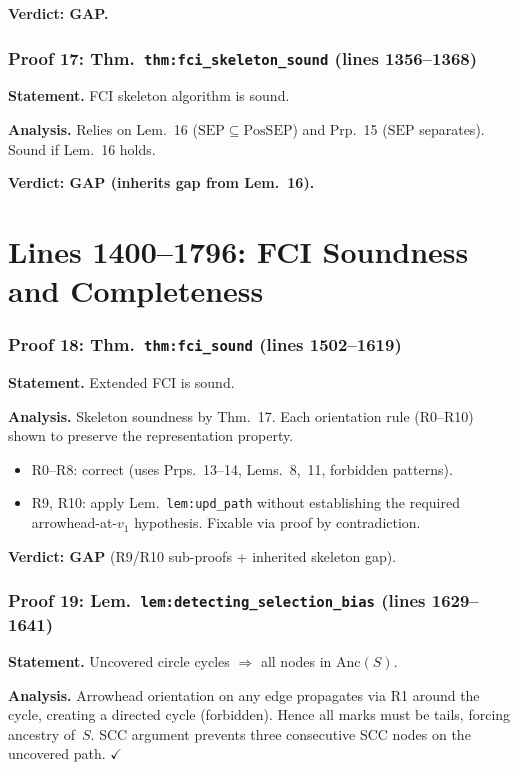 \documentclass{article}
\begin{document}
\textbf{Verdict: GAP.}

\section{Proof 17: Thm.\ \texttt{thm:fci\_skeleton\_sound} (lines 1356--1368)}
\textbf{Statement.} FCI skeleton algorithm is sound.

\textbf{Analysis.} Relies on Lem.~16 ($\mathrm{SEP}\subseteq\mathrm{PosSEP}$)
and Prp.~15 ($\mathrm{SEP}$ separates).  Sound if Lem.~16 holds.

\textbf{Verdict: GAP (inherits gap from Lem.~16).}

\part*{Lines 1400--1796: FCI Soundness and Completeness}

\section{Proof 18: Thm.\ \texttt{thm:fci\_sound} (lines 1502--1619)}
\textbf{Statement.} Extended FCI is sound.

\textbf{Analysis.}
Skeleton soundness by Thm.~17.  Each orientation rule (R0--R10) shown to
preserve the representation property.
\begin{itemize}
  \item R0--R8: correct (uses Prps.~13--14, Lems.~8,~11, forbidden patterns).
  \item R9, R10: apply Lem.\ \texttt{lem:upd\_path} without establishing the
    required arrowhead-at-$v_1$ hypothesis.  Fixable via proof by contradiction.
\end{itemize}

\textbf{Verdict: GAP} (R9/R10 sub-proofs + inherited skeleton gap).

\section{Proof 19: Lem.\ \texttt{lem:detecting\_selection\_bias}
(lines 1629--1641)}
\textbf{Statement.} Uncovered circle cycles $\Rightarrow$ all nodes in
$\mathrm{Anc}(S)$.

\textbf{Analysis.} Arrowhead orientation on any edge propagates via R1 around
the cycle, creating a directed cycle (forbidden).  Hence all marks must be
tails, forcing ancestry of~$S$.  SCC argument prevents three consecutive SCC
nodes on the uncovered path.  $\checkmark$
\end{document}
